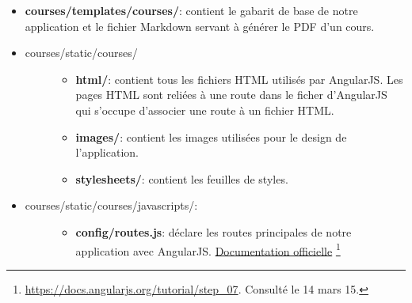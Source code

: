 \documentclass[a4paper,10pt,twoside]{sphinxmanual}
\begin{document}
\begin{itemize}
\begin{description}
\begin{itemize}
\item {} 
\textbf{utils.py}: regroupe une série de fonctions utiles utilisées à travers l'application.

\item {} 
\textbf{views.py}: contient les vues Django. A l'instar des URL, il n'y a que deux fonctions, une qui est le point de départ de l'application et l'autre qui génère le PDF d'un cours. \href{https://docs.djangoproject.com/fr/1.7/topics/http/views/}{Documentation officielle} \footnote{
\href{https://docs.djangoproject.com/fr/1.7/topics/http/views/}{https://docs.djangoproject.com/fr/1.7/topics/http/views/}. Consulté le 14 mars 15.
}

\end{itemize}

\end{description}

\item {} 
\textbf{courses/templates/courses/}: contient le gabarit de base  de notre application et le fichier Markdown  servant à générer le PDF d'un cours.

\item {} \begin{description}
\item[{courses/static/courses/}] \leavevmode\begin{itemize}
\item {} 
\textbf{html/}: contient tous les fichiers HTML utilisés par AngularJS. Les pages HTML sont reliées à une route dans le ficher  d'AngularJS qui s'occupe d'associer une route à un fichier HTML.

\item {} 
\textbf{images/}: contient les images utilisées pour le design de l'application.

\item {} 
\textbf{stylesheets/}: contient les feuilles de styles.

\end{itemize}

\end{description}

\item {} \begin{description}
\item[{courses/static/courses/javascripts/:}] \leavevmode\begin{itemize}
\item {} 
\textbf{config/routes.js}: déclare les routes principales de notre application avec AngularJS. \href{https://docs.angularjs.org/tutorial/step\_07}{Documentation officielle} \footnote{
\href{https://docs.angularjs.org/tutorial/step\_07}{https://docs.angularjs.org/tutorial/step\_07}. Consulté le 14 mars 15.
}


\end{itemize}
\end{description}
\end{itemize}
\end{document}
